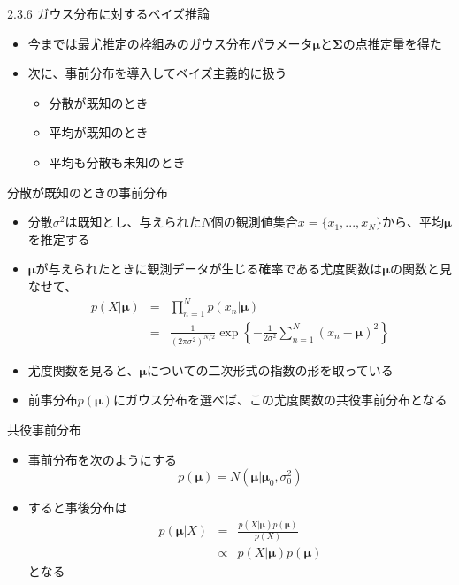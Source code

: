 \begin{frame}{2.3.6 ガウス分布に対するベイズ推論}
 \begin{itemize}
  \item 今までは最尤推定の枠組みのガウス分布パラメータ$\bm{\mu}$と$\bm{\Sigma}$の点推定量を得た
  \item 次に、事前分布を導入してベイズ主義的に扱う
        \begin{itemize}
         \item 分散が既知のとき
         \item 平均が既知のとき
         \item 平均も分散も未知のとき
        \end{itemize}
 \end{itemize}
\end{frame}

\begin{frame}{分散が既知のときの事前分布}
 \begin{itemize}
  \item \alert{分散$\sigma^2$は既知}とし、与えられた$N$個の観測値集合$x=\{x_1,...,x_N\}$から、平均$\bm{\mu}$を推定する
  \item $\bm{\mu}$が与えられたときに観測データが生じる確率である尤度関数は$\bm{\mu}$の関数と見なせて、
        \begin{eqnarray*}
         p(X|\bm{\mu}) &= &\prod_{n=1}^{N}p(x_n|\bm{\mu}) \\
         &=& \frac{1}{(2\pi\sigma^2)^{N/2}}\exp\left\{-\frac{1}{2\sigma^2}\sum_{n=1}^{N}(x_n-\bm{\mu})^2\right\}
        \end{eqnarray*}
  \item 尤度関数を見ると、$\bm{\mu}$についての二次形式の指数の形を取っている
  \item 前事分布$p(\bm{\mu})$にガウス分布を選べば、この尤度関数の共役事前分布となる
 \end{itemize}
\end{frame}

\begin{frame}{共役事前分布}
 \begin{itemize}

  \item 事前分布を次のようにする
        \begin{equation}
         p(\bm{\mu}) = N(\bm{\mu}|\bm{\mu}_0,\sigma_0^2)
        \end{equation}
  \item すると事後分布は
        \begin{eqnarray}
         p(\bm{\mu}|X)&=&\frac{p(X|\bm{\mu})p(\bm{\mu})}{p(X)} \nonumber \\
				 &\propto &p(X|\bm{\mu})p(\bm{\mu})
        \end{eqnarray}
        となる
 \end{itemize}
\end{frame}

